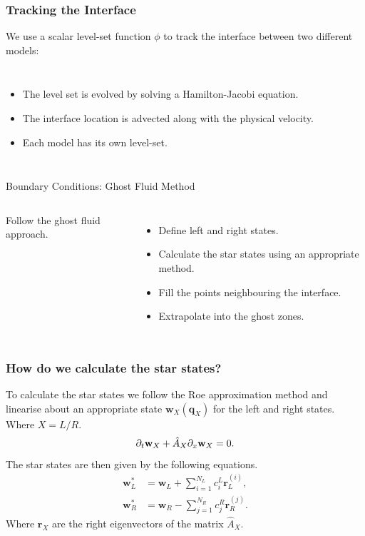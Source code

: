 \documentclass{beamer}
\begin{document}

\begin{frame}
\frametitle{Tracking the Interface}
We use a scalar level-set function $\phi$ to track the interface between two different models:
\begin{columns}
\column{5cm}
\begin{itemize}
\item{The level set is evolved by solving a Hamilton-Jacobi equation.}
\item{The interface location is advected along with the physical velocity.}
\item{Each model has its own level-set.}
\end{itemize}
\column{5cm}
\end{columns}
\end{frame}


\begin{frame}{Boundary Conditions: Ghost Fluid Method}
\begin{columns}
\column{6.5cm}
\centering
\column{4.5cm}
Follow the ghost fluid approach.
\begin{itemize}
\item{Define left and right states.}
\item{Calculate the star states using an appropriate method.}
\item{Fill the points neighbouring the interface.}
\item{Extrapolate into the ghost zones.}
\end{itemize}
\end{columns}
\end{frame}

\begin{frame}
\frametitle{How do we calculate the star states?}
To calculate the star states we follow the Roe approximation method and linearise about an appropriate state $\mathbf{w}_X(\mathbf{q}_X)$ for the left and right states. Where $X = L/R$.
\begin{equation}
\partial_t\mathbf{w}_X + \hat{A}_X\partial_{\mathnormal{x}}\mathbf{w}_X = 0.
\end{equation}
The star states are then given by the following equations.
\begin{align}
\mathbf{w}^*_L &= \mathbf{w}_L+\sum^{N_L}_{i=1}c^L_{i}\mathbf{r}^{(i)}_L,\\
\mathbf{w}^*_R &= \mathbf{w}_R-\sum^{N_R}_{j=1}c^R_{j}\mathbf{r}^{(j)}_R.
\end{align}
Where $\mathbf{r}_X$ are the right eigenvectors of the matrix $\hat{A}_X$.
\end{frame}
\end{document}
